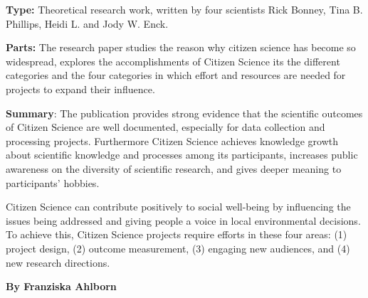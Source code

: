 \documentclass{article}
\begin{document}
\textbf{Type: }Theoretical research work, written by four scientists Rick Bonney, Tina B. Phillips, Heidi L. and Jody W. Enck.


\textbf{Parts: }The research paper studies the reason why citizen science has become so widespread, explores the accomplishments of Citizen Science its the different categories and the four categories in which effort and resources are needed for projects to expand their influence.


\textbf{Summary}: The publication provides strong evidence that the scientific outcomes of Citizen Science are well documented, especially for data collection and processing projects. Furthermore Citizen Science achieves knowledge growth about scientific knowledge and processes among its participants, increases public awareness on the diversity of scientific research, and gives deeper meaning to participants' hobbies.


Citizen Science can contribute positively to social well-being by influencing the issues being addressed and giving people a voice in local environmental decisions. To achieve this, Citizen Science projects require efforts in these four areas: (1) project design, (2) outcome measurement, (3) engaging new audiences, and (4) new research directions.


\textbf{By Franziska Ahlborn}


\printbibliography[title={Literaturverzeichnis}]
\end{document}
